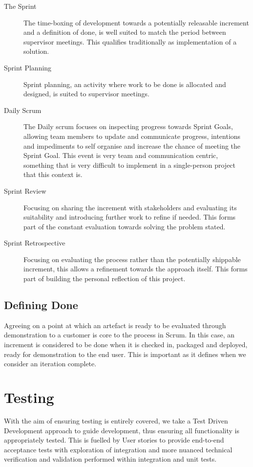 \begin{description}
	\item[The Sprint] The time-boxing of development towards a potentially releasable increment and a definition of done, is well suited to match the period between supervisor meetings. This qualifies traditionally as implementation of a solution.
	
	\item[Sprint Planning] Sprint planning, an activity where work to be done is allocated and designed, is suited to supervisor meetings. 
	
	\item[Daily Scrum] The Daily scrum focuses on inspecting progress towards Sprint Goals, allowing team members to update and communicate progress, intentions and impediments to self organise and increase the chance of meeting the Sprint Goal. This event is very team and communication centric, something that is very difficult to implement in a single-person project that this context is.
	
	\item[Sprint Review] Focusing on sharing the increment with stakeholders and evaluating its suitability and introducing further work to refine if needed. This forms part of the constant evaluation towards solving the problem stated. 
	
	\item[Sprint Retrospective] Focusing on evaluating the process rather than the potentially shippable increment, this allows a refinement towards the approach itself. This forms part of building the personal reflection of this project.
	
\end{description}

\subsection{Defining Done}

Agreeing on a point at which an artefact is ready to be evaluated through demonstration to a customer is core to the process in Scrum. In this case, an increment is considered to be done when it is checked in, packaged and deployed, ready for demonstration to the end user. This is important as it defines when we consider an iteration complete.

\newpage
\section{Testing}

With the aim of ensuring testing is entirely covered, we take a Test Driven Development \parencite{beck2000extreme} approach to guide development, thus ensuring all functionality is appropriately tested. This is fuelled by User stories to provide end-to-end acceptance tests with exploration of integration and more nuanced technical verification and validation performed within integration and unit tests.